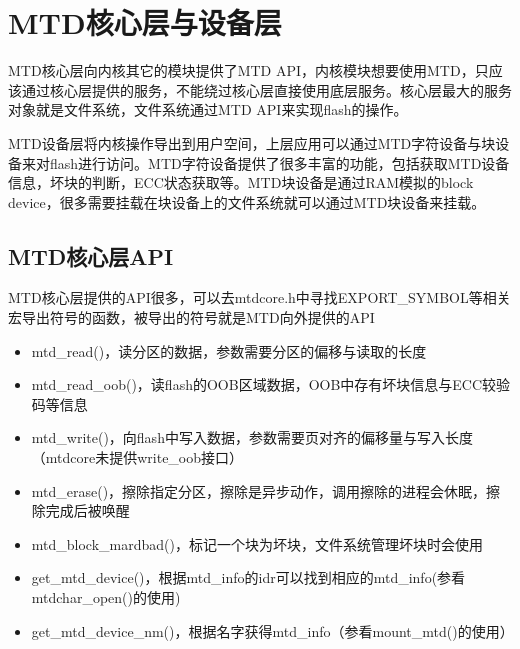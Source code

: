 \section{MTD核心层与设备层}
MTD核心层向内核其它的模块提供了MTD API，内核模块想要使用MTD，只应该通过核心层提供的服务，不能绕过核心层直接使用底层服务。核心层最大的服务对象就是文件系统，文件系统通过MTD API来实现flash的操作。

MTD设备层将内核操作导出到用户空间，上层应用可以通过MTD字符设备与块设备来对flash进行访问。MTD字符设备提供了很多丰富的功能，包括获取MTD设备信息，坏块的判断，ECC状态获取等。MTD块设备是通过RAM模拟的block device，很多需要挂载在块设备上的文件系统就可以通过MTD块设备来挂载。
\subsection{MTD核心层API}
MTD核心层提供的API很多，可以去mtdcore.h中寻找EXPORT\_SYMBOL等相关宏导出符号的函数，被导出的符号就是MTD向外提供的API
\begin{itemize}
  \item mtd\_read()，读分区的数据，参数需要分区的偏移与读取的长度
  \item mtd\_read\_oob()，读flash的OOB区域数据，OOB中存有坏块信息与ECC较验码等信息
  \item mtd\_write()，向flash中写入数据，参数需要页对齐的偏移量与写入长度（mtdcore未提供write\_oob接口）
  \item mtd\_erase()，擦除指定分区，擦除是异步动作，调用擦除的进程会休眠，擦除完成后被唤醒
  \item mtd\_block\_mardbad()，标记一个块为坏块，文件系统管理坏块时会使用
  \item get\_mtd\_device()，根据mtd\_info的idr可以找到相应的mtd\_info(参看mtdchar\_open()的使用)
  \item get\_mtd\_device\_nm()，根据名字获得mtd\_info（参看mount\_mtd()的使用）
\end{itemize}

